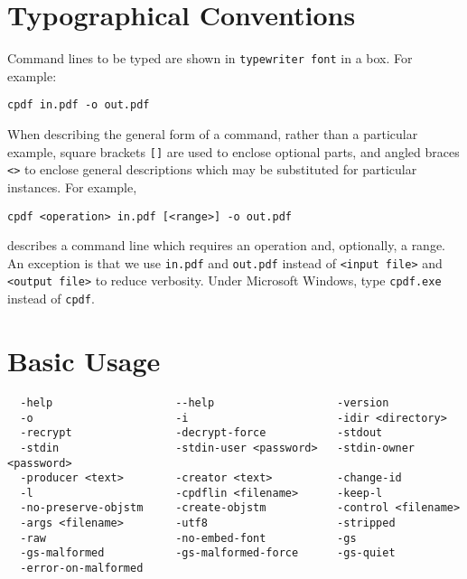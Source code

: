 \documentclass{book}
\begin{document}
\chapter*{Typographical Conventions}
Command lines to be typed are shown in \texttt{typewriter\hspace{-1mm} font} in a box.
For example:
\begin{framed}
\small\verb!cpdf in.pdf -o out.pdf!
\end{framed}
\noindent When describing the general form of a command, rather than a particular
example, square brackets \verb|[]| are used to enclose optional parts, and
angled braces \verb!<>! to enclose general descriptions which may be
substituted for particular instances. For example,
\begin{framed}
\small\verb!cpdf <operation> in.pdf [<range>] -o out.pdf!
\end{framed}
\noindent describes a command line which requires an operation and, optionally,
a range. An exception is that we use \texttt{in.pdf} and \texttt{out.pdf}
instead of \texttt{<input file>} and \texttt{<output file>} to reduce
verbosity. Under Microsoft Windows, type \texttt{cpdf.exe} instead of \texttt{cpdf}.
\clearpage\pagestyle{empty}\cleardoublepage
\mainmatter
\pagestyle{fancy}



\chapter{Basic Usage}\label{chap:1}


\label{basicusage}
  \begin{framed}
  \small
  \noindent\begin{verbatim}
  -help                   --help                   -version 
  -o                      -i                       -idir <directory>
  -recrypt                -decrypt-force           -stdout
  -stdin                  -stdin-user <password>   -stdin-owner <password>  
  -producer <text>        -creator <text>          -change-id
  -l                      -cpdflin <filename>      -keep-l
  -no-preserve-objstm     -create-objstm           -control <filename>
  -args <filename>        -utf8                    -stripped
  -raw                    -no-embed-font           -gs
  -gs-malformed           -gs-malformed-force      -gs-quiet
  -error-on-malformed\end{verbatim}\end{framed}
\end{document}
